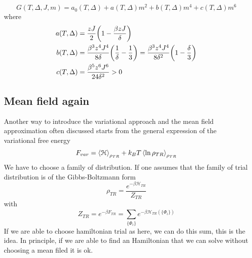 \documentclass[../main/main.tex]{subfiles}
\begin{document}
\begin{exercise}{}{}
\begin{equation}
  G (T, \Delta , J, m) = a_0 (T,\Delta ) + a(T, \Delta )m^2 + b (T, \Delta ) m^4 + c(T, \Delta )m^6
\end{equation}
where
\begin{subequations}
\begin{align}
  a(T,\Delta ) &= \frac{z J}{2} \qty(1 - \frac{\beta z J}{\delta })   \\
  b(T,\Delta ) &= \frac{\beta ^3 z^4 J^4}{8 \delta } \qty(\frac{1}{\delta } - \frac{1}{3}) = \frac{\beta ^3 z^4 J^4}{8 \delta^2 } \qty(1 - \frac{\delta }{3})    \\
  c(T,\Delta ) &= \frac{\beta ^5 z^6 J^6}{24 \delta^2 } > 0
\end{align}
\end{subequations}

\end{exercise}


\subsection{Mean field again}
Another way to introduce the variational approach and the mean field approximation often discussed starts from the general expression of the variational free energy
\begin{equation}
  F_{var} = \expval{\mathcal{H}}_{\rho _{TR}} + k_B T \expval{\ln{\rho _{TR}} }_{\rho _{TR}}
\end{equation}
We have to choose a family of distribution.
If one assumes that the family of trial distribution is of the Gibbs-Boltzmann form
\begin{equation}
  \rho _{TR} = \frac{e^{- \beta \mathcal{H}_{TR}} }{Z_{TR}}
\end{equation}
with
\begin{equation}
  Z_{TR} = e^{-\beta F_{TR}} = \sum_{\{ \Phi _i \}  }^{} e^{-\beta \mathcal{H}_{TR} ( \{ \Phi _i \}  )}
\end{equation}
If we are able to choose hamiltonian trial as here, we can do this sum, this is the idea. In principle, if we are able to find an Hamiltonian that we can solve without choosing a mean filed it is ok.
\end{document}
